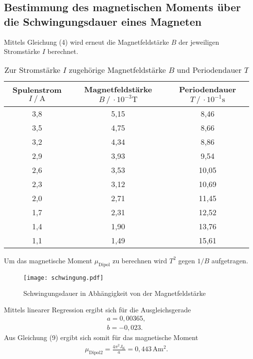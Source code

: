 \subsection{Bestimmung des magnetischen Moments über die Schwingungsdauer eines Magneten}
Mittels Gleichung (4) wird erneut die Magnetfeldstärke $B$ der jeweiligen Stromstärke $I$ berechnet.
\begin{table}
\centering
\caption{Zur Stromstärke $I$ zugehörige Magnetfeldstärke $B$ und Periodendauer $T$}
\label{tab:schwingung}
\begin{tabular}{c c c}
\toprule
Spulenstrom $I\:/\:\si{\ampere}$ & Magnetfeldstärke $B\:/\:\cdot 10^{-3}\si{\tesla}$ & Periodendauer $T\:/\:\cdot 10^{-1}\si{\second}$ \\
\midrule
3,8 & 5,15 & 8,46 \\
3,5 & 4,75 & 8,66 \\
3,2 & 4,34 & 8,86 \\
2,9 & 3,93 & 9,54 \\
2,6 & 3,53 & 10,05 \\
2,3 & 3,12 & 10,69 \\
2,0 & 2,71 & 11,45 \\
1,7 & 2,31 & 12,52 \\
1,4 & 1,90 & 13,76 \\
1,1 & 1,49 & 15,61 \\
\bottomrule
\end{tabular}
\end{table}
Um das magnetische Moment $\mu_\text{Dipol}$ zu berechnen wird $T^2$ gegen $1/B$ aufgetragen.
\begin{figure}[H]
  \center
  \texttt{[image: schwingung.pdf]}
  \caption{Schwingungsdauer in Abhängigkeit von der Magnetfeldstärke}
  \label{fig:schwingung}
\end{figure}
Mittels linearer Regression ergibt sich für die Ausgleichsgerade
\begin{gather*}
a = 0,00365, \\
b = -0,023.
\end{gather*}
Aus Gleichung (9) ergibt sich somit für das magnetische Moment
\begin{gather}
\mu_\text{Dipol2} = \frac{4\pi^2J_\text{K}}{a} = 0,443\,\si{\ampere\meter\squared}.
\end{gather}

